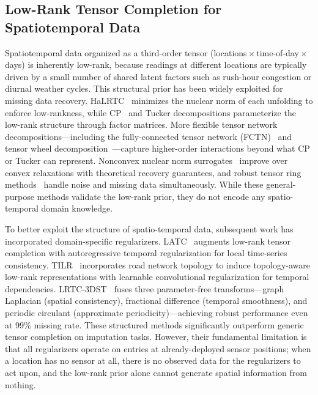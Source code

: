 \documentclass[journal]{IEEEtran}
\begin{document}
\subsection{Low-Rank Tensor Completion for Spatiotemporal Data}

Spatiotemporal data organized as a third-order tensor (locations\,$\times$\,time-of-day\,$\times$\,days) is inherently low-rank, because readings at different locations are typically driven by a small number of shared latent factors such as rush-hour congestion or diurnal weather cycles. This structural prior has been widely exploited for missing data recovery. HaLRTC~\cite{liu2013tensor} minimizes the nuclear norm of each unfolding to enforce low-rankness, while CP~\cite{carroll1970analysis,harshman1970foundations} and Tucker decompositions parameterize the low-rank structure through factor matrices. More flexible tensor network decompositions---including the fully-connected tensor network (FCTN)~\cite{zheng2021fctn} and tensor wheel decomposition~\cite{wu2022tw}---capture higher-order interactions beyond what CP or Tucker can represent. Nonconvex nuclear norm surrogates~\cite{yao2022nonconvex,qiu2024balanced} improve over convex relaxations with theoretical recovery guarantees, and robust tensor ring methods~\cite{qiu2022ntr,he2024scalable} handle noise and missing data simultaneously. While these general-purpose methods validate the low-rank prior, they do not encode any spatio-temporal domain knowledge.

To better exploit the structure of spatio-temporal data, subsequent work has incorporated domain-specific regularizers. LATC~\cite{chen2022latc} augments low-rank tensor completion with autoregressive temporal regularization for local time-series consistency. TILR~\cite{han2025tilr} incorporates road network topology to induce topology-aware low-rank representations with learnable convolutional regularization for temporal dependencies. LRTC-3DST~\cite{shu2024lrtc3dst} fuses three parameter-free transforms---graph Laplacian (spatial consistency), fractional difference (temporal smoothness), and periodic circulant (approximate periodicity)---achieving robust performance even at 99\% missing rate. These structured methods significantly outperform generic tensor completion on imputation tasks. However, their fundamental limitation is that all regularizers operate on entries at already-deployed sensor positions; when a location has no sensor at all, there is no observed data for the regularizers to act upon, and the low-rank prior alone cannot generate spatial information from nothing.
\end{document}
